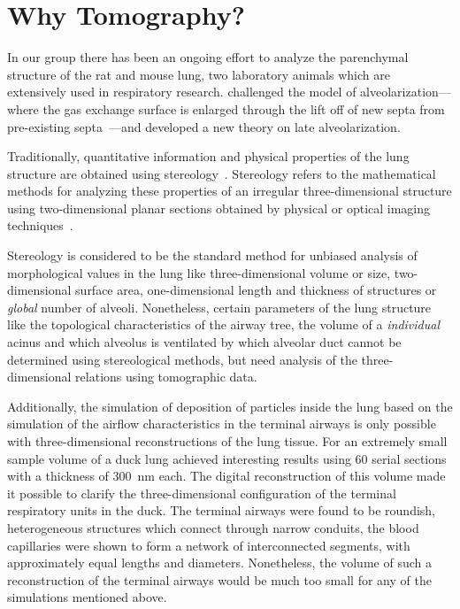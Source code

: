 \section{Why Tomography?}
In our group there has been an ongoing effort to analyze the parenchymal structure of the rat and mouse lung, two laboratory animals which are extensively used in respiratory research. \citet{Schittny2008} challenged the model of alveolarization---where the gas exchange surface is enlarged through the lift off of new septa from pre-existing septa~\cite{Burri1974,Massaro1985}---and developed a new theory on late alveolarization.

Traditionally, quantitative information and physical properties of the lung structure are obtained using stereology~\cite{Ochs2006}. Stereology refers to the mathematical methods for analyzing these properties of an irregular three-dimensional structure using two-dimensional planar sections obtained by physical or optical imaging techniques~\cite{Hsia2010}.

Stereology is considered to be the standard method for unbiased analysis of morphological values in the lung like three-dimensional volume or size, two-dimensional surface area, one-dimensional length and thickness of structures or \emph{global} number of alveoli. Nonetheless, certain parameters of the lung structure like the topological characteristics of the airway tree, the volume of a \emph{individual} acinus and which alveolus is ventilated by which alveolar duct cannot be determined using stereological methods, but need analysis of the three-dimensional relations using tomographic data.

Additionally, the simulation of deposition of particles inside the lung based on the simulation of the airflow characteristics in the terminal airways is only possible with three-dimensional reconstructions of the lung tissue. For an extremely small sample volume of a duck lung \citet{Woodward2005} achieved interesting results using 60 serial sections with a thickness of \SI{300}{\nano\meter} each. The digital reconstruction of this volume made it possible to clarify the three-dimensional configuration of the terminal respiratory units in the duck. The terminal airways were found to be roundish, heterogeneous structures which connect through narrow conduits, the blood capillaries were shown to form a network of interconnected segments, with approximately equal lengths and diameters. Nonetheless, the volume of such a reconstruction of the terminal airways would be much too small for any of the simulations mentioned above.

